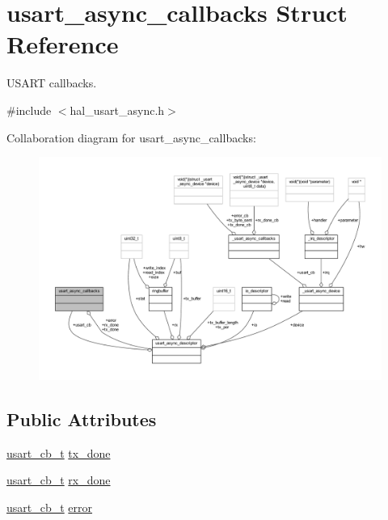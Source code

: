 \hypertarget{structusart__async__callbacks}{}\section{usart\+\_\+async\+\_\+callbacks Struct Reference}
\label{structusart__async__callbacks}


U\+S\+A\+RT callbacks.  




{\ttfamily \#include $<$hal\+\_\+usart\+\_\+async.\+h$>$}



Collaboration diagram for usart\+\_\+async\+\_\+callbacks\+:
\nopagebreak
\begin{figure}[H]
\begin{center}
\leavevmode
\includegraphics[width=350pt]{structusart__async__callbacks__coll__graph}
\end{center}
\end{figure}
\subsection*{Public Attributes}
\begin{DoxyCompactItemize}
\item 
\hyperlink{group__doc__driver__hal__usart__async_ga430e4080a53e1f39c4d46da01200f633}{usart\+\_\+cb\+\_\+t} \hyperlink{structusart__async__callbacks_a3b40d7b9783136ddf7e9bf49b9598d08}{tx\+\_\+done}
\item 
\hyperlink{group__doc__driver__hal__usart__async_ga430e4080a53e1f39c4d46da01200f633}{usart\+\_\+cb\+\_\+t} \hyperlink{structusart__async__callbacks_a5363ee6cc91c18b9cec22fcfc7270895}{rx\+\_\+done}
\item 
\hyperlink{group__doc__driver__hal__usart__async_ga430e4080a53e1f39c4d46da01200f633}{usart\+\_\+cb\+\_\+t} \hyperlink{structusart__async__callbacks_a04f0dca1ca10974d9458dd11871a5b58}{error}
\end{DoxyCompactItemize}



